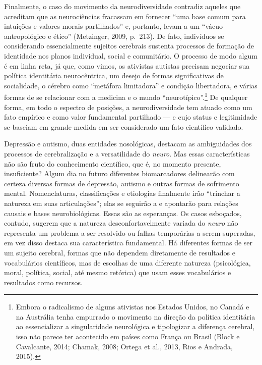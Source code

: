 Finalmente, o caso do movimento da neurodiversidade contradiz aqueles
que acreditam que as neurociências fracassam em fornecer ``uma base
comum para intuições e valores morais partilhados'' e, portanto, levam a
um ``vácuo antropológico e ético'' (Metzinger, 2009, p.~213). De fato,
indivíduos se considerando essencialmente sujeitos cerebrais sustenta
processos de formação de identidade nos planos individual, social e
comunitário. O processo de modo algum é em linha reta, já que, como
vimos, os ativistas autistas precisam negociar sua política identitária
neurocêntrica, um desejo de formas significativas de socialidade, o
cérebro como ``metáfora limitadora'' e condição libertadora, e várias
formas de se relacionar com a medicina e o mundo
``neurotípico''.\footnote[33]{Embora o radicalismo de alguns ativistas nos Estados Unidos, no
Canadá e na Austrália tenha empurrado o movimento na direção da política
identitária ao essencializar a singularidade neurológica e tipologizar a
diferença cerebral, isso não parece ter acontecido em países como França
ou Brasil (Block e Cavalcante, 2014; Chamak, 2008; Ortega et al., 2013,
Rios e Andrada, 2015).} De qualquer forma, em todo o
espectro de posições, a neurodiversidade tem atuado como um fato
empírico e como valor fundamental partilhado --- e cujo status e
legitimidade se baseiam em grande medida em ser considerado um fato
científico validado.

Depressão e autismo, duas entidades nosológicas, destacam as
ambiguidades dos processos de cerebralização e a versatilidade do
\emph{neuro}. Mas essas características não são fruto do conhecimento
científico, que é, no momento presente, insuficiente? Algum dia no
futuro diferentes biomarcadores delinearão com certeza diversas formas
de depressão, autismo e outras formas de sofrimento mental.
Nomenclaturas, classificações e etiologias finalmente irão ``trinchar a
natureza em suas articulações''; elas se seguirão a e apontarão para
relações causais e bases neurobiológicas. Essas são as esperanças. Os
casos esboçados, contudo, sugerem que a natureza desconfortavelmente
variada do \emph{neuro} não representa um problema a ser resolvido ou
falhas temporárias a serem superadas, em vez disso destaca sua
característica fundamental. Há diferentes formas de ser um sujeito
cerebral, formas que não dependem diretamente de resultados e
vocabulários científicos, mas de escolhas de uma diferente natureza
(psicológica, moral, política, social, até mesmo retórica) que usam
esses vocabulários e resultados como recursos.

